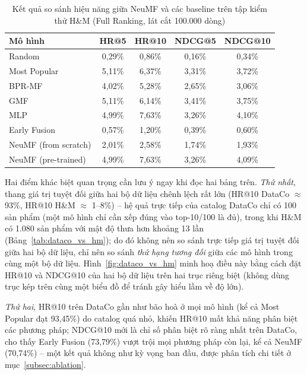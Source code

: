 \begin{table}[htbp]
    \centering
    \caption{Kết quả so sánh hiệu năng giữa NeuMF và các baseline trên tập kiểm thử H\&M (Full Ranking, lát cắt 100.000 dòng)}
    \label{tab:results_hm}
    \begin{tabular}{|l|c|c|c|c|}
        \hline
        \textbf{Mô hình} & \textbf{HR@5} & \textbf{HR@10} & \textbf{NDCG@5} & \textbf{NDCG@10} \\
        \hline
        Random & 0,29\% & 0,86\% & 0,16\% & 0,34\% \\
        \hline
        Most Popular & 5,11\% & 6,37\% & 3,31\% & 3,72\% \\
        \hline
        BPR-MF & 4,02\% & 5,28\% & 2,65\% & 3,06\% \\
        \hline
        GMF & 5,11\% & 6,14\% & 3,41\% & 3,75\% \\
        \hline
        MLP & 4,99\% & 7,63\% & 3,26\% & 4,10\% \\
        \hline
        Early Fusion & 0,57\% & 1,20\% & 0,39\% & 0,60\% \\
        \hline
        NeuMF (from scratch) & 2,01\% & 2,58\% & 1,74\% & 1,93\% \\
        \hline
        NeuMF (pre-trained) & 4,99\% & 7,63\% & 3,26\% & 4,09\% \\
        \hline
    \end{tabular}
\end{table}

Hai điểm khác biệt quan trọng cần lưu ý ngay khi đọc hai bảng trên. \textit{Thứ nhất}, thang giá trị tuyệt đối giữa hai bộ dữ liệu chênh lệch rất lớn (HR@10 DataCo $\approx$ 93\%, HR@10 H\&M $\approx$ 1--8\%) -- hệ quả trực tiếp của catalog DataCo chỉ có 100 sản phẩm (một mô hình chỉ cần xếp đúng vào top-10/100 là đủ), trong khi H\&M có 1.080 sản phẩm với mật độ thưa hơn khoảng 13 lần (Bảng~\ref{tab:dataco_vs_hm}); do đó không nên so sánh trực tiếp giá trị tuyệt đối giữa hai bộ dữ liệu, chỉ nên so sánh \emph{thứ hạng tương đối} giữa các mô hình trong cùng một bộ dữ liệu. Hình~\ref{fig:dataco_vs_hm} minh hoạ điều này bằng cách đặt HR@10 và NDCG@10 của hai bộ dữ liệu trên hai trục riêng biệt (không dùng trục kép trên cùng một biểu đồ để tránh gây hiểu lầm về độ lớn).

\textit{Thứ hai}, HR@10 trên DataCo gần như bão hoà ở mọi mô hình (kể cả Most Popular đạt 93,45\%) do catalog quá nhỏ, khiến HR@10 mất khả năng phân biệt các phương pháp; NDCG@10 mới là chỉ số phân biệt rõ ràng nhất trên DataCo, cho thấy Early Fusion (73,79\%) vượt trội mọi phương pháp còn lại, kể cả NeuMF (70,74\%) -- một kết quả không như kỳ vọng ban đầu, được phân tích chi tiết ở mục~\ref{subsec:ablation}.

